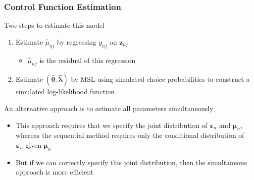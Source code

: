 \documentclass{beamer}
\begin{document}
\begin{frame}\frametitle{Control Function Estimation}
    Two steps to estimate this model
    \begin{enumerate}
        \item Estimate $\widehat{\mu}_{nj}$ by regressing $y_{nj}$ on $\bm{z}_{nj}$
        \begin{itemize}
            \item $\widehat{\mu}_{nj}$ is the residual of this regression
        \end{itemize}
        \item Estimate $(\widehat{\bm{\theta}}, \widehat{\bm{\lambda}})$ by MSL using simulated choice probabilities to construct a simulated log-likelihood function
    \end{enumerate}
    \vspace{3ex}
    An alternative approach is to estimate all parameters simultaneously
    \begin{itemize}
        \item This approach requires that we specify the joint distribution of $\bm{\varepsilon}_n$ and $\bm{\mu}_n$, whereas the sequential method requires only the conditional distribution of $\bm{\varepsilon}_n$ given $\bm{\mu}_n$
        \item But if we can correctly specify this joint distribution, then the simultaneous approach is more efficient
    \end{itemize}
\end{frame}
\end{document}

